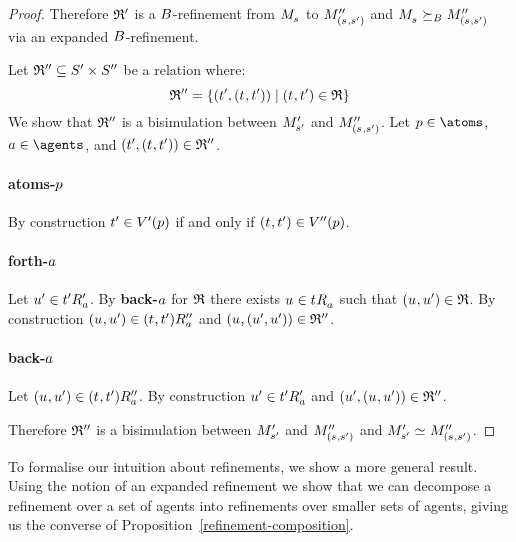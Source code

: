 \begin{proof}
Therefore $\mathfrak{R}'$ is a $B$-refinement from $\kPModel{\kStateS}$ to $\kPModelPP{(\kStateS, \kStateSP)}$ and $\kPModel{\kStateS} \simulatesBs \kPModelPP{(\kStateS, \kStateSP)}$ via an expanded $B$-refinement.

Let $\mathfrak{R}'' \subseteq {S^{\prime}} \times {S^{\prime\prime}}$ be a relation where:
$$
\bisimulation'' = \{(\kStateTP, (\kStateT, \kStateTP)) \mid (\kStateT, \kStateTP) \in \refinement\}
$$
We show that $\mathfrak{R}''$ is a bisimulation between ${M^{\prime}_{{s}^{\prime}}}$ and $\kPModelPP{(\kStateS, \kStateSP)}$.
Let $\atomP \in \atoms$, $\agentA \in \agents$, and $(\kStateTP, (\kStateT, \kStateTP)) \in \bisimulation''$.

\paragraph{atoms-$p$}
By construction ${t}^{\prime} \in {V^{\prime}}(p)$ if and only if $(\kStateT, \kStateTP) \in \kValuationPP(\atomP)$.

\paragraph{forth-$a$}
Let ${u}^{\prime} \in {{t}^{\prime}} {R^{\prime}_{a}}$.
By {\bf back-$a$} for $\mathfrak{R}$ there exists $\kStateU \in \kSuccessorsA{\kStateT}$ such that $(\kStateU, \kStateUP) \in \refinement$.
By construction $(\kStateU, \kStateUP) \in \kSuccessorsPPA{(\kStateT, \kStateTP)}$ and $(\kStateU, (\kStateUP, \kStateUP)) \in \bisimulation''$.

\paragraph{back-$a$}
Let $(\kStateU, \kStateUP) \in \kSuccessorsPPA{(\kStateT, \kStateTP)}$.
By construction ${u}^{\prime} \in {{t}^{\prime}} {R^{\prime}_{a}}$ and $(\kStateUP, (\kStateU, \kStateUP)) \in \bisimulation''$.

Therefore $\mathfrak{R}''$ is a bisimulation between ${M^{\prime}_{{s}^{\prime}}}$ and $\kPModelPP{(\kStateS, \kStateSP)}$ and $\kPModelP{\kStateSP} \bisimilar \kPModelPP{(\kStateS, \kStateSP)}$.
\end{proof}

To formalise our intuition about refinements, we show a more general result.
Using the notion of an expanded refinement we show that we can decompose a refinement over a set of agents into refinements over smaller sets of agents, giving us the converse of Proposition~\ref{refinement-composition}.

